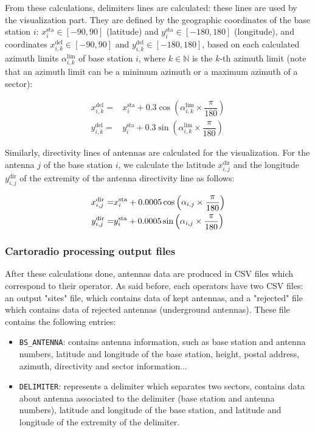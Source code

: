 \documentclass[a4paper, 11pt]{report}
\begin{document}
    From these calculations, delimiters lines are calculated: these lines are used by the visualization part. They are defined by the geographic coordinates of the base station $i$: $x^{\text{sta}}_{i} \in [-90, 90]$ (latitude) and $y^{\text{sta}}_{i}  \in [-180, 180]$ (longitude), and coordinates $x^{\text{del}}_{i, k} \in [-90, 90]$ and $y^{\text{del}}_{i, k} \in [-180, 180]$, based on each calculated azimuth limits $\alpha^{\text{lim}}_{i, k}$ of base station $i$, where $k \in \mathbb{N}$ is the $k$-th azimuth limit (note that an azimuth limit can be a minimum azimuth or a maximum azimuth of a sector):
    
    \begin{align}
        x^{\text{del}}_{i, k} = & x^{\text{sta}}_i + 0.3 \cos\left(\alpha^{\text{lim}}_{i, k} \times \dfrac{\pi}{180}\right) \\
        y^{\text{del}}_{i, k} = & y^{\text{sta}}_i + 0.3 \sin\left(\alpha^{\text{lim}}_{i, k} \times \dfrac{\pi}{180}\right)
    \end{align}
    
    Similarly, directivity lines of antennas are calculated for the visualization. For the antenna $j$ of the base station $i$, we calculate the latitude $x^{\text{dir}}_{i, j}$ and the longitude $y^{\text{dir}}_{i, j}$ of the extremity of the antenna directivity line as follows:
    
    \begin{align}
        x^{\text{\text{dir}}}_{i, j} = & x^{\text{sta}}_i + 0.0005 \cos\left(\alpha_{i, j} \times \dfrac{\pi}{180}\right) \\
        y^{\text{\text{dir}}}_{i, j} = & y^{\text{sta}}_i + 0.0005 \sin\left(\alpha_{i, j} \times \dfrac{\pi}{180}\right)
    \end{align}
    
    \subsubsection{Cartoradio processing output files}
    
    After these calculations done, antennas data are produced in CSV files which correspond to their operator. As said before, each operators have two CSV files: an output "sites" file, which contains data of kept antennas, and a "rejected" file which contains data of rejected antennas (underground antennas). These file contains the following entries:
    
    \begin{itemize}
        \item \texttt{BS\_ANTENNA}: contains antenna information, such as base station and antenna numbers, latitude and longitude of the base station, height, postal address, azimuth, directivity and sector information...
        \item \texttt{DELIMITER}: represents a delimiter which separates two sectors, contains data about antenna associated to the delimiter (base station and antenna numbers), latitude and longitude of the base station, and latitude and longitude of the extremity of the delimiter.
    \end{itemize}
    
\end{document}
